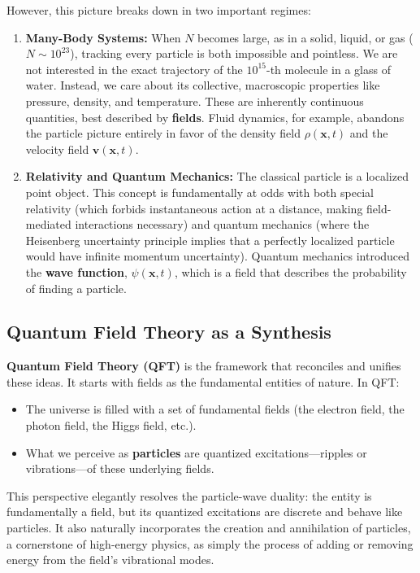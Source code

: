 \documentclass[11pt, a4paper, article]{article}
\renewcommand{\vec}[1]{\bm{#1}} %
\begin{document}
However, this picture breaks down in two important regimes:
\begin{enumerate}
    \item \textbf{Many-Body Systems:} When $N$ becomes large, as in a solid, liquid, or gas ($N \sim 10^{23}$), tracking every particle is both impossible and pointless. We are not interested in the exact trajectory of the $10^{15}$-th molecule in a glass of water. Instead, we care about its collective, macroscopic properties like pressure, density, and temperature. These are inherently continuous quantities, best described by \textbf{fields}. Fluid dynamics, for example, abandons the particle picture entirely in favor of the density field $\rho(\vec{x}, t)$ and the velocity field $\vec{v}(\vec{x}, t)$.

    \item \textbf{Relativity and Quantum Mechanics:} The classical particle is a localized point object. This concept is fundamentally at odds with both special relativity (which forbids instantaneous action at a distance, making field-mediated interactions necessary) and quantum mechanics (where the Heisenberg uncertainty principle implies that a perfectly localized particle would have infinite momentum uncertainty). Quantum mechanics introduced the \textbf{wave function}, $\psi(\vec{x},t)$, which is a field that describes the probability of finding a particle.
\end{enumerate}

\subsection{Quantum Field Theory as a Synthesis}
\textbf{Quantum Field Theory (QFT)} is the framework that reconciles and unifies these ideas. It starts with fields as the fundamental entities of nature. In QFT:
\begin{itemize}
    \item The universe is filled with a set of fundamental fields (the electron field, the photon field, the Higgs field, etc.).
    \item What we perceive as \textbf{particles} are quantized excitations—ripples or vibrations—of these underlying fields.
\end{itemize}
This perspective elegantly resolves the particle-wave duality: the entity is fundamentally a field, but its quantized excitations are discrete and behave like particles. It also naturally incorporates the creation and annihilation of particles, a cornerstone of high-energy physics, as simply the process of adding or removing energy from the field's vibrational modes.
\end{document}
